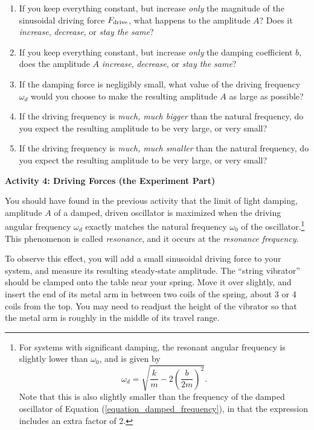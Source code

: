 \begin{enumerate}[labparts]

\item If you keep everything constant, but increase \textit{only} the magnitude of the sinusoidal driving force $F_{\rm drive}$, what happens to the amplitude $A$?  Does it \textit{increase}, \textit{decrease}, or \textit{stay the same}?
\answerspace{0.7in}

\item If you keep everything constant, but increase \textit{only} the damping coefficient $b$, does the amplitude $A$ \textit{increase}, \textit{decrease}, or \textit{stay the same}?
\answerspace{0.7in}

\item If the damping force is negligibly small, what value of the driving frequency $\omega_d$ would you choose to make the resulting amplitude $A$ as large as possible?
\answerspace{0.7in}

\item If the driving frequency is \textit{much, much bigger} than the natural frequency, do you expect the resulting amplitude to be very large, or very small?
\answerspace{0.7in}

\item If the driving frequency is \textit{much, much smaller} than the natural frequency, do you expect the resulting amplitude to be very large, or very small?
\answerspace{0.7in}

\end{enumerate}

\pagebreak
\textbf{Activity 4: Driving Forces (the Experiment Part)}

You should have found in the previous activity that the limit of light damping, amplitude $A$ of a damped, driven oscillator is maximized when the driving angular frequency $\omega_d$ exactly matches the natural frequency $\omega_0$ of the oscillator.\footnote{%
For systems with significant damping, the resonant angular frequency is slightly lower than $\omega_0$, and is given by
$$
\omega_d =\sqrt{\frac{k}{m} - 2\left( \frac{b}{2m}\right)^2}.
$$
Note that this is also slightly smaller than the frequency of the damped oscillator of Equation (\ref{equation_damped_frequency}), in that the expression includes an extra factor of 2.
}
This phenomenon is called \textit{resonance}, and it occurs at the \textit{resonance frequency}.

To observe this effect, you will add a small sinusoidal driving force to your system, and measure its resulting steady-state amplitude.
The ``string vibrator'' should be clamped onto the table near your spring.  Move it over slightly, and insert the end of its metal arm in between two coils of the spring, about 3 or 4 coils from the top.  You may need to readjust the height of the vibrator so that the metal arm is roughly in the middle of its travel range.

